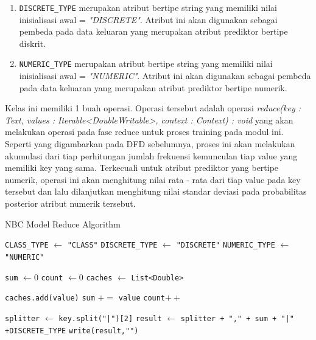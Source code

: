 \begin{enumerate}
\begin{enumerate}
		\item \verb|DISCRETE_TYPE| merupakan atribut bertipe string yang memiliki nilai inisialisasi awal = \textit{"DISCRETE"}. Atribut ini akan digunakan sebagai pembeda pada data keluaran yang merupakan atribut prediktor bertipe diskrit.

		\item \verb|NUMERIC_TYPE| merupakan atribut bertipe string yang memiliki nilai inisialisasi awal = \textit{"NUMERIC"}. Atribut ini akan digunakan sebagai pembeda pada data keluaran yang merupakan atribut prediktor bertipe numerik.
	\end{enumerate}
	
	Kelas ini memiliki 1 buah operasi. Operasi tersebut adalah operasi \textit{reduce(key : Text, values : Iterable<DoubleWritable>, context : Context) : void} yang akan melakukan operasi pada fase reduce untuk proses training pada modul ini. Seperti yang digambarkan pada DFD sebelumnya, proses ini akan melakukan akumulasi dari tiap perhitungan jumlah frekuensi kemunculan tiap value yang memiliki key yang sama. Terkecuali untuk atribut prediktor yang bertipe numerik, operasi ini akan menghitung nilai rata - rata dari tiap value pada key tersebut dan lalu dilanjutkan menghitung nilai standar deviasi pada probabilitas posterior atribut numerik tersebut.
	
	
\begin{algorithm}[H]
\caption{NBC Model Reduce Algorithm}\label{alg:NBCGenReduce}
\begin{algorithmic}[1]

\State \verb|CLASS_TYPE| $\gets$ \texttt{"CLASS"}
\State \verb|DISCRETE_TYPE| $\gets$ \texttt{"DISCRETE"}
\State \verb|NUMERIC_TYPE| $\gets$ \texttt{"NUMERIC"}

\State \texttt{sum} $\gets 0$
\State \texttt{count} $\gets 0$
\State \texttt{caches} $\gets$ \texttt{List<Double>}

	\State \texttt{caches.add(value)}
	\State \texttt{sum} $+=$ \texttt{value}
	\State \texttt{count}$++$
\EndFor


\State \texttt{splitter} $\gets$ \texttt{key.split("|")[2]}
\State \texttt{result} $\gets$ \texttt{splitter + "," + sum + "|" +}\verb|DISCRETE_TYPE|
\State \texttt{write(result,"")}



\end{algorithmic}
\end{algorithm}
\end{enumerate}
